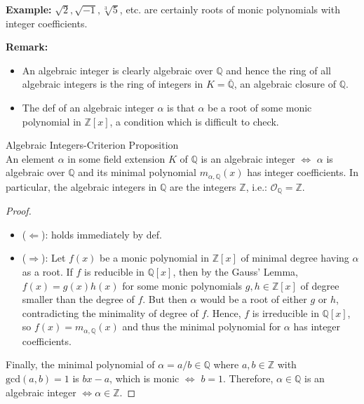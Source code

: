 \noindent\textbf{Example:} $\sqrt{2} ,\sqrt{-1}, \sqrt[3]{5}$, etc. are certainly roots of monic polynomials with integer coefficients.

\noindent\textbf{Remark:} \begin{itemize}
    \item An algebraic integer is clearly algebraic over $\mathbb{Q}$ and hence the ring of all algebraic integers is the ring of integers in $K=\overline{\mathbb{Q}}$, an algebraic closure of $\mathbb{Q}$.

    \item The def of an algebraic integer $\alpha$ is that $\alpha$ be a root of some monic polynomial in $\mathbb{Z}[x]$, a condition which is difficult to check.
\end{itemize}

\begin{proposition}{Algebraic Integers-Criterion Proposition}\\
An element $\alpha$ in some field extension $K$ of $\mathbb{Q}$ is an algebraic integer $\Leftrightarrow$ $\alpha$ is algebraic over $\mathbb{Q}$ and its minimal polynomial $m_{\alpha, \mathbb{Q}} (x)$ has integer coefficients. In particular, the algebraic integers in $\mathbb{Q}$ are the integers $\mathbb{Z}$, i.e.: $\mathcal{O}_\mathbb{Q}= \mathbb{Z}$.
\end{proposition}

\begin{proof}
    \begin{itemize}
        \item ($\Leftarrow$): holds immediately by def.
        \item ($\Rightarrow$): Let $f(x)$ be a monic polynomial in $\mathbb{Z}[x]$ of minimal degree having $\alpha$ as a root. If $f$ is reducible in $\mathbb{Q} [x]$, then by the Gauss' Lemma, $f(x) =g(x)h(x
        )$ for some monic polynomials $g,h \in \mathbb{Z}[x]$ of degree smaller than the degree of $f$. But then $\alpha$ would be a root of either $g$ or $h$, contradicting the minimality of degree of $f$. Hence, $f$ is irreducible in $\mathbb{Q} [x]$, so $f(x) =m_{\alpha, \mathbb{Q}} (x)$ and thus the minimal polynomial for $\alpha$ has integer coefficients.
    \end{itemize}
    Finally, the minimal polynomial of $\alpha= a/b\in \mathbb{Q}$ where $a,b \in \mathbb{Z}$ with $\text{gcd}(a,b)=1$ is $bx-a$, which is monic $\Leftrightarrow$ $b=1$. Therefore, $\alpha \in \mathbb{Q}$ is an algebraic integer $\Leftrightarrow \alpha \in \mathbb{Z}$.
\end{proof}


